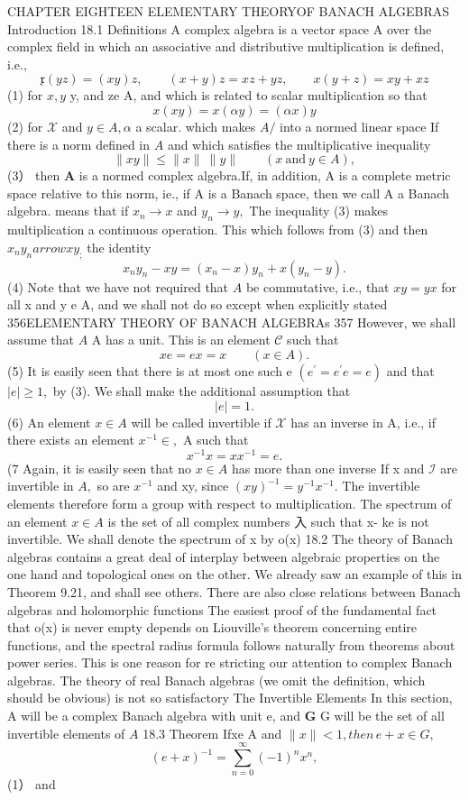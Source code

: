 CHAPTER EIGHTEEN ELEMENTARY THEORYOF BANACH ALGEBRAS Introduction 18.1 Definitions A complex algebra is a vector space A over the complex field in which an associative and distributive multiplication is defined, i.e., $$ {\mathfrak{x}}(y z)=(x y)z,\qquad(x+y)z=x z+y z,\qquad x(y+z)=x y+x z $$ (1) for $x,y$ y, and ze A, and which is related to scalar multiplication so that $$ x(x y)=x(\alpha y)=(\alpha x)y $$ (2) for $\scriptstyle{\mathcal{X}}$ and $y\in A,\alpha$ a scalar. which makes $A\!\!\!/$ into a normed linear space If there is a norm defined in $\scriptstyle A$ and which satisfies the multiplicative inequality $$ \|x y\|\leq\|x\|\ \|y\|\qquad(x{\mathrm{~and~}}y\in A), $$ (3） then ${\boldsymbol{A}}$ is a normed complex algebra.If, in addition, A is a complete metric space relative to this norm, ie., if A is a Banach space, then we call A a Banach algebra. means that if $x_{n}\to x$ and $y_{n}\to y,$ The inequality (3) makes multiplication a continuous operation. This which follows from (3) and then $x_{n}y_{n} arrow x y_{;}$ the identity $$ x_{n}y_{n}-x y=(x_{n}-x)y_{n}+x(y_{n}-y). $$ (4) Note that we have not required that $\scriptstyle A$ be commutative, i.e., that $x y=y x$ for all x and y e A, and we shall not do so except when explicitly stated 356ELEMENTARY THEORY OF BANACH ALGEBRAs 357 However, we shall assume that $\scriptstyle A$ A has a unit. This is an element $\scriptstyle{\mathcal{C}}$ such that $$ x e=e x=x\qquad(x\in A). $$ (5) It is easily seen that there is at most one such e $(e^{\prime}=e^{\prime}e=e)$ and that $|e|\geq1,$ by (3). We shall make the additional assumption that $$ |e|=1. $$ (6) An element $x\in A$ will be called invertible if $\scriptstyle{\mathcal{X}}$ has an inverse in A, i.e., if there exists an element $x^{-1}\in,$ A such that $$ x^{-1}x=x x^{-1}=e. $$ (7 Again, it is easily seen that no $x\in A$ has more than one inverse If x and $\scriptstyle{\mathcal{I}}$ are invertible in $A,$ so are $x^{-1}$ and xy, since $(x y)^{-1}=y^{-1}x^{-1}.$ The invertible elements therefore form a group with respect to multiplication. The spectrum of an element $x\in A$ is the set of all complex numbers 入 such that x- ke is not invertible. We shall denote the spectrum of x by o(x) 18.2 The theory of Banach algebras contains a great deal of interplay between algebraic properties on the one hand and topological ones on the other. We already saw an example of this in Theorem 9.21, and shall see others. There are also close relations between Banach algebras and holomorphic functions The easiest proof of the fundamental fact that o(x) is never empty depends on Liouville's theorem concerning entire functions, and the spectral radius formula follows naturally from theorems about power series. This is one reason for re stricting our attention to complex Banach algebras. The theory of real Banach algebras (we omit the definition, which should be obvious) is not so satisfactory The Invertible Elements In this section, A will be a complex Banach algebra with unit e, and ${\boldsymbol{G}}$ G will be the set of all invertible elements of $\scriptstyle A$ 18.3 Theorem Ifxe A and $\|x\|<1,t h e n\,e+x\in G,$ $$ (e+x)^{-1}=\sum_{n=0}^{\infty}(-1)^{n}x^{n}, $$ (1） and $$ 